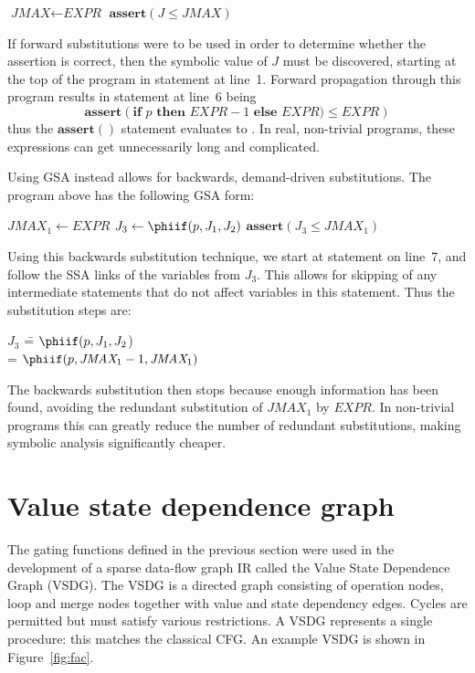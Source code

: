 {
  \def\Expr{\textit{EXPR}}
  \def\JMAX{\textit{JMAX}}
  \newcommand\assert[1]{\textbf{assert}\left(#1\right)}
  
\begin{algorithm}[H]
  $\JMAX\gets\Expr$\;
  \eIf{$p$}{
    $J\gets\JMAX-1$\;
  }{
    $J\gets\JMAX$\;
  }
  $\assert{J\leq \JMAX}$\;
\label{fig:tupaduaexample}
\end{algorithm}

If forward substitutions were to be used in order to determine whether the assertion is correct, then the symbolic value of $J$ must be discovered, starting at the top of the program in statement at line~1. 
Forward propagation through this program results in statement at line~6 being
$$\assert{\textbf{if } p \textbf{ then } \Expr-1 \textbf{ else }\Expr)\leq \Expr}$$
thus the $\assert{}$ statement evaluates to \true. 
In real, non-trivial programs, these expressions can get unnecessarily long and complicated.


Using GSA instead allows for backwards, demand-driven substitutions. The program above has the following GSA form:

\begin{algorithm}[H]
  $\JMAX_1\gets\Expr$\;
  \eIf{$p$}{
    $J_1\gets\JMAX_1-1$\;
  }{
    $J_2\gets\JMAX_1$\;
  }
  $J_3\gets\phiif(p,J_1,J_2)$\;
  $\assert{J_3\leq \JMAX_1}$\;
\label{fig:tupaduagsasubs}
\end{algorithm}

Using this backwards substitution technique, we start at statement on line~7, and follow the SSA links of the variables from $J_3$. 
This allows for skipping of any intermediate statements that do not affect variables in this statement. 
Thus the substitution steps are:

    \begin{tabbing}
        ${J_3}$ \= = $\phiif(p,J_1,J_2$)\\
        \> = $\phiif(p,\JMAX_1 - 1,\JMAX_1)$
    \end{tabbing}

The backwards substitution then stops because enough information has been found, avoiding the redundant substitution of $\JMAX_1$ by $\Expr$. 
In non-trivial programs this can greatly reduce the number of redundant substitutions, making symbolic analysis significantly cheaper.

\section{Value state dependence graph}
The gating functions defined in the previous section were used in the development of a sparse data-flow graph IR called the Value State Dependence Graph (VSDG). 
The VSDG is a directed graph consisting of operation nodes, loop and merge nodes together with value and state dependency edges. 
Cycles are permitted but must satisfy various restrictions. 
A VSDG represents a single procedure: 
this matches the classical CFG.
%
An example VSDG is shown in Figure~\ref{fig:fac}. 

}
